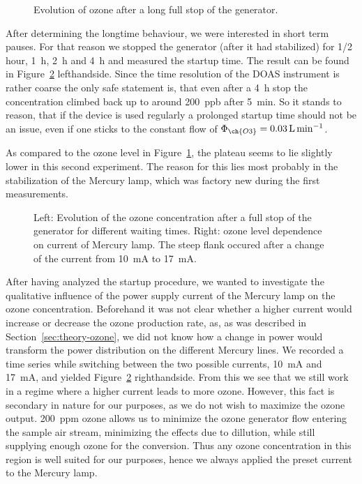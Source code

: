 \begin{figure}[htbp]
  \centering
  
  \caption{Evolution of ozone after a long full stop of the
    generator.}
  \label{fig:long-stop}
\end{figure}

After determining the longtime behaviour, we were interested in
short term pauses. For that reason we stopped the generator (after it
had stabilized) for {\nfrac{} 1/2} \si{hour}, \SI{1}{\hour},
\SI{2}{\hour} and \SI{4}{\hour} and measured the startup time. The
result can be found in Figure~\ref{fig:multiple-stop}
lefthandside. Since the time resolution of the DOAS instrument is
rather coarse the only safe statement is, that even after a
\SI{4}{\hour} stop the concentration climbed back up to around
\SI{200}{ppb} after \SI{5}{\minute}. So it stands to reason, that if
the device is used regularly a prolonged startup time should not be an
issue, even if one sticks to the constant flow of $\Phi_{\ch{O3}} =
\SI{0.03}{\liter\per\minute}$.

As compared to the ozone level in Figure~\ref{fig:long-stop}, the
plateau seems to lie slightly lower in this second experiment. The
reason for this lies most probably in the stabilization of the Mercury
lamp, which was factory new during the first measurements.

\begin{figure}[htbp]
  \centering
  
  \hfill
  
  \caption{Left: Evolution of the ozone concentration after a full stop of the
    generator for different waiting times. Right: ozone level
    dependence on current of Mercury lamp. The steep
    flank occured after a change of the current from
    \SI{10}{\milli\ampere} to \SI{17}{\milli\ampere}.}
  \label{fig:multiple-stop}
\end{figure}

After having analyzed the startup procedure, we wanted to investigate the
qualitative influence of the power supply current of the Mercury lamp
on the ozone concentration. Beforehand it was not clear whether a
higher current would increase or decrease the ozone production rate,
as, as was described in Section~\ref{sec:theory-ozone}, we did not
know how a change in power would transform the power distribution on
the different Mercury lines. We recorded a time series while switching
between the two possible currents, \SI{10}{\milli\ampere} and
\SI{17}{\milli\ampere}, and yielded Figure~\ref{fig:multiple-stop}
righthandside. From this we see that we still work in a regime where a
higher current leads to more ozone. However, this fact is secondary in
nature for our purposes, as we do not wish to maximize the ozone
output. \SI{200}{ppm} ozone allows us to minimize the ozone generator
flow entering the sample air stream, minimizing the effects due to
dillution, while still supplying enough ozone for the conversion. Thus
any ozone concentration in this region is well suited for our
purposes, hence we always applied the preset current to the Mercury
lamp. 

